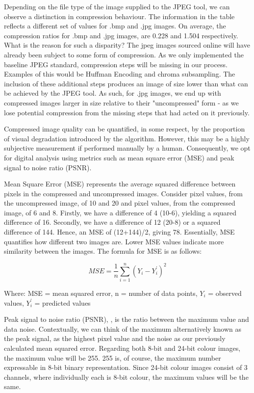 \documentclass{l4proj}
\begin{document}
Depending on the file type of the image supplied to the JPEG tool, we can observe a distinction in compression behaviour. The information in the table reflects a different set of values for .bmp and .jpg images. On average, the compression ratios for .bmp and .jpg images, are 0.228 and 1.504 respectively. What is the reason for such a disparity? The jpeg images sourced online will have already been subject to some form of compression. As we only implemented the baseline JPEG standard, compression steps will be missing in our process. Examples of this would be Huffman Encoding and chroma subsampling. The inclusion of these additional steps produces an image of size lower than what can be achieved by the JPEG tool. As such, for .jpg images, we end up with compressed images larger in size relative to their "uncompressed" form - as we lose potential compression from the missing steps that had acted on it previously. 

Compressed image quality can be quantified, in some respect, by the proportion of visual degradation introduced by the algorithm. However, this may be a highly subjective measurement if performed manually by a human. Consequently, we opt for digital analysis using metrics such as mean square error (MSE) and peak signal to noise ratio (PSNR).

Mean Square Error (MSE) represents the average squared difference between pixels in the compressed and uncompressed images. Consider pixel values, from the uncompressed image, of 10 and 20 and pixel values, from the compressed image, of 6 and 8. Firstly, we have a difference of 4 (10-6), yielding a squared difference of 16. Secondly, we have a difference of 12 (20-8) or a squared difference of 144. Hence, an MSE of (12+144)/2, giving 78. Essentially, MSE quantifies how different two images are. Lower MSE values indicate more similarity between the images. The formula for MSE \citep{mseexplanation} is as follows:


\[MSE = \frac{1}{n}\sum_{i=1}^{n}(Y_{i}-Y^{'}_i ) ^2\]

Where: MSE = mean squared error, n = number of data points, \(Y_{i}\) = observed values, \(Y^{'}_i\) = predicted values


Peak signal to noise ratio (PSNR), \citep{psnrform}, is the ratio between the maximum value and data noise. Contextually, we can think of the maximum alternatively known as the peak signal, as the highest pixel value and the noise as our previously calculated mean squared error. Regarding both 8-bit and 24-bit colour images, the maximum value will be 255. 255 is, of course, the maximum number expressable in 8-bit binary representation. Since 24-bit colour images consist of 3 channels, where individually each is 8-bit colour, the maximum values will be the same.
\end{document}
